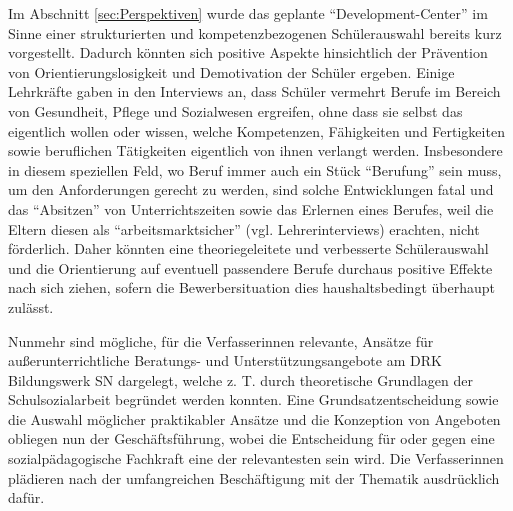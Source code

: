 Im Abschnitt \ref{sec:Perspektiven} wurde das geplante "`Development-Center"' im Sinne einer strukturierten und kompetenzbezogenen Schülerauswahl bereits kurz vorgestellt. Dadurch könnten sich positive Aspekte hinsichtlich der Prävention von Orientierungslosigkeit und Demotivation der Schüler ergeben. Einige Lehrkräfte gaben in den Interviews an, dass Schüler vermehrt Berufe im Bereich von Gesundheit, Pflege und Sozialwesen ergreifen, ohne dass sie selbst das eigentlich wollen oder wissen, welche Kompetenzen, Fähigkeiten und Fertigkeiten sowie beruflichen Tätigkeiten eigentlich von ihnen verlangt werden. Insbesondere in diesem speziellen Feld, wo Beruf immer auch ein Stück "`Berufung"' sein muss, um den Anforderungen gerecht zu werden, sind solche Entwicklungen fatal und das "`Absitzen"' von Unterrichtszeiten sowie das Erlernen eines Berufes, weil die Eltern diesen als "`arbeitsmarktsicher"' (vgl. Lehrerinterviews) erachten, nicht förderlich. Daher könnten eine theoriegeleitete  und verbesserte Schülerauswahl und die Orientierung auf eventuell passendere Berufe durchaus positive Effekte nach sich ziehen, sofern die Bewerbersituation dies haushaltsbedingt überhaupt zulässt. 

Nunmehr sind mögliche, für die Verfasserinnen relevante, Ansätze für außerunterrichtliche Beratungs- und Unterstützungsangebote am DRK Bildungswerk SN dargelegt, welche z. T. durch theoretische Grundlagen der Schulsozialarbeit begründet werden konnten. Eine Grundsatzentscheidung sowie die Auswahl möglicher praktikabler Ansätze und die Konzeption von Angeboten obliegen nun der Geschäftsführung, wobei die Entscheidung für oder gegen eine sozialpädagogische Fachkraft eine der relevantesten sein wird. Die Verfasserinnen plädieren nach der umfangreichen Beschäftigung mit der Thematik ausdrücklich dafür. 

